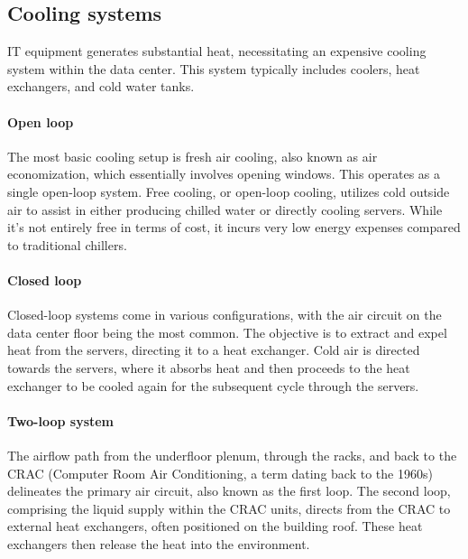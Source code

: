 \subsection{Cooling systems}
IT equipment generates substantial heat, necessitating an expensive cooling system within the data center. 
This system typically includes coolers, heat exchangers, and cold water tanks.

\paragraph*{Open loop}
The most basic cooling setup is fresh air cooling, also known as air economization, which essentially involves opening windows. 
This operates as a single open-loop system.
Free cooling, or open-loop cooling, utilizes cold outside air to assist in either producing chilled water or directly cooling servers. 
While it's not entirely free in terms of cost, it incurs very low energy expenses compared to traditional chillers.

\paragraph*{Closed loop}
Closed-loop systems come in various configurations, with the air circuit on the data center floor being the most common.
The objective is to extract and expel heat from the servers, directing it to a heat exchanger. 
Cold air is directed towards the servers, where it absorbs heat and then proceeds to the heat exchanger to be cooled again for the subsequent cycle through the servers.

\paragraph*{Two-loop system}
The airflow path from the underfloor plenum, through the racks, and back to the CRAC (Computer Room Air Conditioning, a term dating back to the 1960s) delineates the primary air circuit, also known as the first loop.
The second loop, comprising the liquid supply within the CRAC units, directs from the CRAC to external heat exchangers, often positioned on the building roof. 
These heat exchangers then release the heat into the environment.

